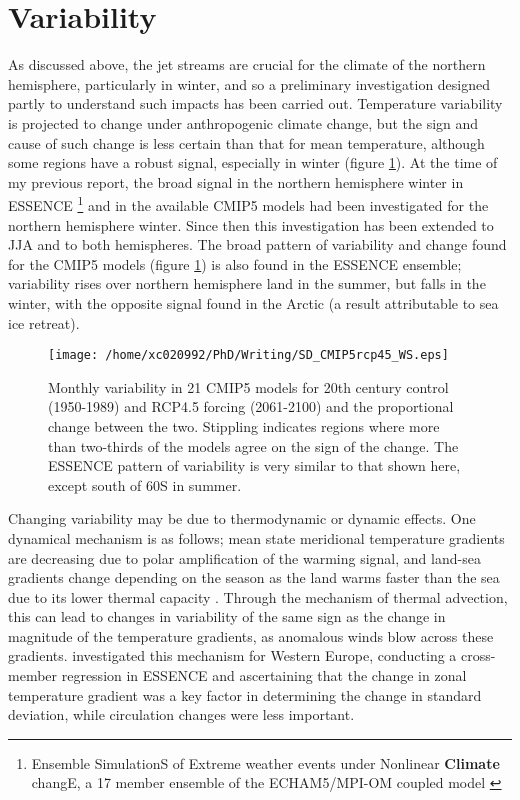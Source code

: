 \documentclass [11pt,a4paper,twosided] {report}
\begin{document}
\section*{Variability}
As discussed above, the jet streams are crucial for the climate of the northern hemisphere, particularly in winter, and so a preliminary investigation designed partly to understand such impacts has been carried out. Temperature variability is projected to change under anthropogenic climate change, but the sign and cause of such change is less certain than that for mean temperature, although some regions have a robust signal, especially in winter (figure \ref{fig:SDch_CMIP}). At the time of my previous report, the broad signal in the northern hemisphere winter in ESSENCE \footnote{Ensemble SimulationS of Extreme weather events under Nonlinear {\bf Climate} changE, a 17 member ensemble of the ECHAM5/MPI-OM coupled model \citep{Sterl08}}  and in the available CMIP5 models had been investigated for the northern hemisphere winter. Since then this investigation has been extended to JJA and to both hemispheres. The broad pattern of variability and change found for the CMIP5 models (figure \ref{fig:SDch_CMIP}) is also found in the ESSENCE ensemble; variability rises over northern hemisphere land in the summer, but falls in the winter, with the opposite signal found in the Arctic (a result attributable to sea ice retreat).\\
\begin{figure}[!t]
\centering
\texttt{[image: /home/xc020992/PhD/Writing/SD\_CMIP5rcp45\_WS.eps]}
\caption{Monthly variability in 21 CMIP5 models for 20th century control (1950-1989) and RCP4.5 forcing (2061-2100) and the proportional change between the two. Stippling indicates regions where more than two-thirds of the models agree on the sign of the change. The ESSENCE pattern of variability is very similar to that shown here, except south of 60S in summer.}\label{fig:SDch_CMIP}
\end{figure}
Changing variability may be due to thermodynamic or dynamic effects. One dynamical mechanism is as follows; mean state meridional temperature gradients are decreasing due to polar amplification of the warming signal, and land-sea gradients change depending on the season as the land warms faster than the sea due to its lower thermal capacity \citep{Boer11}. Through the mechanism of thermal advection, this can lead to changes in variability of the same sign as the change in magnitude of the temperature gradients, as anomalous winds blow across these gradients. \citet{deVries} investigated this mechanism for Western Europe, conducting a cross-member regression in ESSENCE and ascertaining that the change in zonal temperature gradient was a key factor in determining the change in standard deviation, while circulation changes were less important. \\
\end{document}
